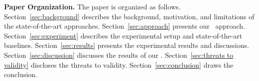 \textbf{Paper Organization.} 
The paper is organized as follows.
Section~\ref{sec:background} describes the background, motivation, and limitations of the state-of-the-art approaches.
Section~\ref{sec:approach} presents our \our~approach. 
Section~\ref{sec:experiment} describes the experimental setup and state-of-the-art baselines. 
Section~\ref{sec:results} presents the experimental results and discussions. 
Section~\ref{sec:discussion} discusses the results of our \our. 
Section~\ref{sec:threats to validity} discloses the threats to validity.
Section~\ref{sec:conclusion} draws the conclusion. 




